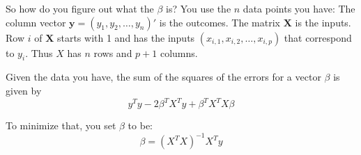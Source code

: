 \documentclass[12pt]{article}
\begin{document}
So how do you figure out what the $\beta$ is? You use the $n$ data points you have: The column vector $\boldsymbol{y} = (y_1, y_2, \ldots, y_n)'$ is the outcomes. The matrix $\boldsymbol{X}$ is the inputs.  Row $i$ of $\boldsymbol{X}$ starts with 1 and has the inputs $(x_{i,1}, x_{i,2},\ldots,x_{i, p})$ that correspond to $y_i$. Thus $X$ has $n$ rows and $p+1$ columns.

Given the data you have, the sum of the squares of the errors for a vector $\beta$ is given by 
\begin{equation*}
y^T y - 2 \beta^T X^T y + \beta^T X^T X \beta
\end{equation*}

To minimize that, you set $\beta$ to be:
\begin{equation*}
\beta = \left( X^T X \right)^{-1} X^T y
\end{equation*}
\end{document}
